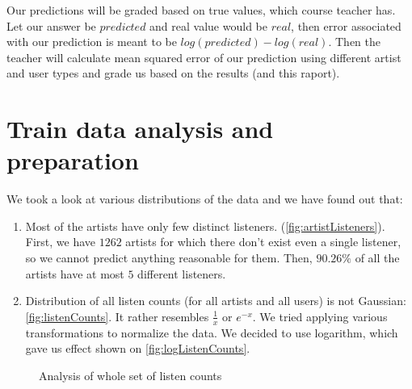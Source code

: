 \documentclass{report}
\begin{document}
Our predictions will be graded based on true values, which course teacher has. Let our answer be $predicted$ and real value would be $real$, then error associated with our prediction is meant to be $log(predicted) - log(real)$. Then the teacher will calculate mean squared error \cite{mse} of our prediction using different artist and user types and grade us based on the results (and this raport).

\section{Train data analysis and preparation}
We took a look at various distributions of the data and we have found out that:
\begin{enumerate}[1.]
\item Most of the artists have only few distinct listeners. (\ref{fig:artistListeners}). First, we have $1262$ artists for which there don't exist even a single listener, so we cannot predict anything reasonable for them. Then, $90.26\%$ of all the artists have at most $5$ different listeners.
\item Distribution of all listen counts (for all artists and all users) is not Gaussian: \ref{fig:listenCounts}. It rather resembles $\frac{1}{x}$ or $e^{-x}$. We tried applying various transformations to normalize the data. We decided to use logarithm, which gave us effect shown on \ref{fig:logListenCounts}.
\end{enumerate}
\begin{figure}[!h]
\center
{}

\caption{Analysis of whole set of listen counts}
\end{figure}
\end{document}
